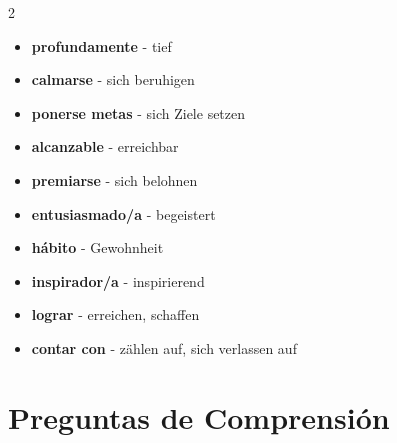 \documentclass[12pt,a4paper]{article}
\begin{document}
\begin{multicols}{2}
\begin{itemize}[leftmargin=*]
    \item \textbf{profundamente} - tief
    \item \textbf{calmarse} - sich beruhigen
    \item \textbf{ponerse metas} - sich Ziele setzen
    \item \textbf{alcanzable} - erreichbar
    \item \textbf{premiarse} - sich belohnen
    \item \textbf{entusiasmado/a} - begeistert
    \item \textbf{hábito} - Gewohnheit
    \item \textbf{inspirador/a} - inspirierend
    \item \textbf{lograr} - erreichen, schaffen
    \item \textbf{contar con} - zählen auf, sich verlassen auf
\end{itemize}
\end{multicols}

\newpage

\section*{Preguntas de Comprensión}
\end{document}
